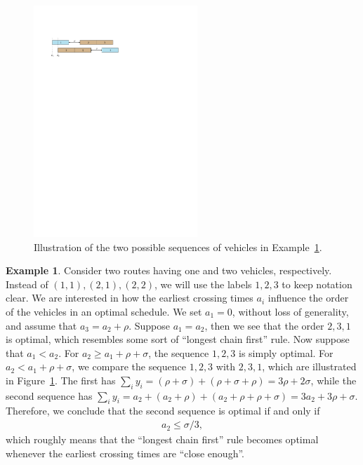 \documentclass[a4paper]{report}
\theoremstyle{definition}
\newtheorem{eg}{Example}[chapter]
\theoremstyle{plain}
\begin{document}
\begin{figure}
  \centering
  \includegraphics[width=0.55\textwidth]{figures/single/123.pdf}
  \caption{Illustration of the two possible sequences of vehicles in
    Example~\ref{example2}.}
  \label{fig:example2}
\end{figure}

\begin{eg}
  \label{example2}
  Consider two routes having one and two vehicles, respectively. Instead of
  $(1,1), (2,1), (2,2)$, we will use the labels $1, 2, 3$ to keep notation
  clear. We are interested in how the earliest crossing times $a_i$ influence the
  order of the vehicles in an optimal schedule. We set $a_{1} = 0$, without loss
  of generality, and assume that $a_{3} = a_{2} + \rho$. Suppose
  $a_{1} = a_{2}$, then we see that the order $2, 3, 1$ is optimal, which
  resembles some sort of ``longest chain first'' rule. Now suppose that
  $a_{1} < a_{2}$. For $a_{2} \geq a_{1} + \rho + \sigma$, the sequence
  $1, 2, 3$ is simply optimal. For $a_{2} < a_{1} + \rho + \sigma$, we compare
  the sequence $1, 2, 3$ with $2, 3, 1$, which are illustrated in
  Figure~\ref{fig:example2}. The first has
  $\sum_{i} y_{i} = (\rho+\sigma) + (\rho+\sigma+\rho) = 3\rho + 2\sigma$,
  while the second sequence has
  $\sum_{i} y_{i} = a_{2} + (a_{2} + \rho) + (a_{2} + \rho + \rho + \sigma) = 3 a_{2} + 3\rho + \sigma$.
  Therefore, we conclude that the second sequence is optimal if and only if
  \begin{align}
    \label{eq:before-condition}
    a_{2} \leq \sigma/3 ,
  \end{align}
  which roughly means that the ``longest chain first'' rule becomes optimal
  whenever the earliest crossing times are ``close enough''.
\end{eg}
\end{document}
